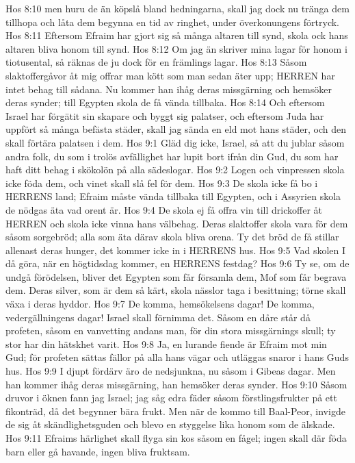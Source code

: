 Hos 8:10  men huru de än köpslå bland hedningarna, skall jag dock nu tränga dem tillhopa och låta dem begynna en tid av ringhet, under överkonungens förtryck.
Hos 8:11  Eftersom Efraim har gjort sig så många altaren till synd, skola ock hans altaren bliva honom till synd.
Hos 8:12  Om jag än skriver mina lagar för honom i tiotusental, så räknas de ju dock för en främlings lagar.
Hos 8:13  Såsom slaktoffergåvor åt mig offrar man kött som man sedan äter upp; HERREN har intet behag till sådana. Nu kommer han ihåg deras missgärning och hemsöker deras synder; till Egypten skola de få vända tillbaka.
Hos 8:14  Och eftersom Israel har förgätit sin skapare och byggt sig palatser, och eftersom Juda har uppfört så många befästa städer, skall jag sända en eld mot hans städer, och den skall förtära palatsen i dem.
Hos 9:1  Gläd dig icke, Israel, så att du jublar såsom andra folk, du som i trolös avfällighet har lupit bort ifrån din Gud, du som har haft ditt behag i skökolön på alla sädeslogar.
Hos 9:2  Logen och vinpressen skola icke föda dem, och vinet skall slå fel för dem.
Hos 9:3  De skola icke få bo i HERRENS land; Efraim måste vända tillbaka till Egypten, och i Assyrien skola de nödgas äta vad orent är.
Hos 9:4  De skola ej få offra vin till drickoffer åt HERREN och skola icke vinna hans välbehag. Deras slaktoffer skola vara för dem såsom sorgebröd; alla som äta därav skola bliva orena. Ty det bröd de få stillar allenast deras hunger, det kommer icke in i HERRENS hus.
Hos 9:5  Vad skolen I då göra, när en högtidsdag kommer, en HERRENS festdag?
Hos 9:6  Ty se, om de undgå förödelsen, bliver det Egypten som får församla dem, Mof som får begrava dem. Deras silver, som är dem så kärt, skola nässlor taga i besittning; törne skall växa i deras hyddor.
Hos 9:7  De komma, hemsökelsens dagar! De komma, vedergällningens dagar! Israel skall förnimma det. Såsom en dåre står då profeten, såsom en vanvetting andans man, för din stora missgärnings skull; ty stor har din hätskhet varit.
Hos 9:8  Ja, en lurande fiende är Efraim mot min Gud; för profeten sättas fällor på alla hans vägar och utläggas snaror i hans Guds hus.
Hos 9:9  I djupt fördärv äro de nedsjunkna, nu såsom i Gibeas dagar. Men han kommer ihåg deras missgärning, han hemsöker deras synder.
Hos 9:10  Såsom druvor i öknen fann jag Israel; jag såg edra fäder såsom förstlingsfrukter på ett fikonträd, då det begynner bära frukt. Men när de kommo till Baal-Peor, invigde de sig åt skändlighetsguden och blevo en styggelse lika honom som de älskade.
Hos 9:11  Efraims härlighet skall flyga sin kos såsom en fågel; ingen skall där föda barn eller gå havande, ingen bliva fruktsam.
